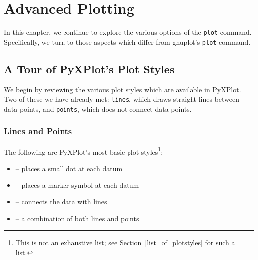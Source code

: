 %
%
%
%
%



\chapter{Advanced Plotting}

In this chapter, we continue to explore the various options of the {\tt plot}
command. Specifically, we turn to those aspects which differ from gnuplot's
{\tt plot} command.

\section{A Tour of PyXPlot's Plot Styles}

We begin by reviewing the various plot styles which are available in PyXPlot.
Two of these we have already met: {\tt lines}, which draws straight lines
between data points, and {\tt points}, which does not connect data points.

\subsection{Lines and Points}

The following are PyXPlot's most basic plot styles\footnote{This is not an
exhaustive list; see Section~\ref{list_of_plotstyles} for such a list.}:
\begin{itemize}
\item {} -- places a small dot at each datum
\item {} -- places a marker symbol at each datum
\item {} -- connects the data with lines
\item {} -- a combination of both lines and points
\end{itemize}

